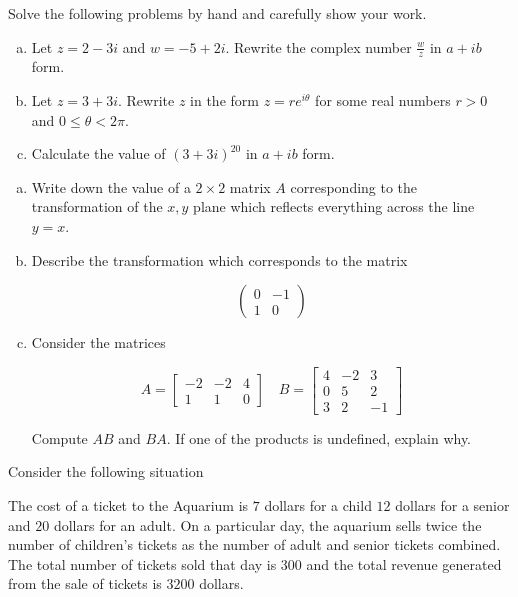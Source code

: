 \documentclass[11pt]{exam}
\theoremstyle{definition}
\begin{document}
\begin{questions}
Solve the following problems by hand and carefully show your work.

\begin{enumerate}[(a)]
\item Let $z=2-3i$ and $w=-5+2i$.  Rewrite the complex number $\frac{w}{z}$ in $a+ib$ form.
\vspace{2.7in}
\item Let $z = 3 + 3i$.  Rewrite $z$ in the form $z = re^{i\theta}$ for some real numbers $r>0$ and $0\leq \theta < 2\pi$.
\vspace{2.7in}
\item Calculate the value of $(3+3i)^{20}$ in $a + ib$ form.
\end{enumerate}


\newpage
\question[10]\mbox{}

\begin{enumerate}[(a)]
\item Write down the value of a $2\times 2$ matrix $A$ corresponding to the transformation of the $x,y$ plane which reflects everything across the line $y=x$.
\vspace{2in}
\item Describe the transformation which corresponds to the matrix

$$\left(\begin{array}{cc}
 0 & -1\\
 1 &  0
\end{array}\right)$$
\vspace{3in}

\item Consider the matrices

$$A = \left[\begin{array}{ccc} -2 & -2 & 4\\ 1 & 1 & 0\end{array}\right]
\quad
B = \left[\begin{array}{ccc} 4 & -2 & 3\\ 0 & 5 & 2\\ 3 & 2 & -1\end{array}\right]$$

Compute $AB$ and $BA$.  If one of the products is undefined, explain why.
\end{enumerate}

\newpage
\question[10]\mbox{}

Consider the following situation

The cost of a ticket to the Aquarium is $7$ dollars for a child $12$ dollars for a senior and $20$ dollars for an adult.
On a particular day, the aquarium sells twice the number of children's tickets as the number of adult and senior tickets combined.
The total number of tickets sold that day is $300$ and the total revenue generated from the sale of tickets is $3200$ dollars.


\end{questions}
\end{document}
